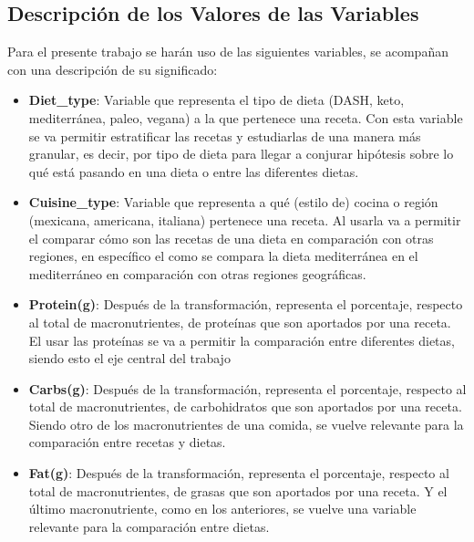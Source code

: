 \documentclass[12pt,a4paper]{article}
\begin{document}
    \subsection{Descripción de los Valores de las Variables}
    Para el presente trabajo se harán uso de las siguientes variables, se 
    acompañan con una descripción de su significado:
    \begin{itemize}[label=\textbullet]
        \item \textbf{Diet\_type}: Variable que representa el tipo de 
        dieta (DASH, keto, mediterránea, paleo, vegana) a la que 
        pertenece una receta. Con esta variable se va permitir estratificar 
        las recetas y estudiarlas de una manera más granular, es decir, 
        por tipo de dieta para llegar a conjurar hipótesis sobre lo qué 
        está pasando en una dieta o entre las diferentes dietas.
        \item \textbf{Cuisine\_type}: Variable que representa a qué (estilo 
        de) cocina o región (mexicana, americana, italiana) pertenece una 
        receta. Al usarla va a permitir el comparar cómo son las recetas 
        de una dieta en comparación con otras regiones, en específico el 
        como se compara la dieta mediterránea en el mediterráneo en comparación 
        con otras regiones geográficas.
        \item \textbf{Protein(g)}: Después de la transformación, representa el 
        porcentaje, respecto al total de macronutrientes, de proteínas que son 
        aportados por una receta. El usar las proteínas se va a permitir la 
        comparación entre diferentes dietas, siendo esto el eje central del trabajo
        \item \textbf{Carbs(g)}: Después de la transformación, representa el 
        porcentaje, respecto al total de macronutrientes, de carbohidratos que 
        son aportados por una receta. Siendo otro de los macronutrientes de una 
        comida, se vuelve relevante para la comparación entre recetas y dietas.
        \item \textbf{Fat(g)}: Después de la transformación, representa el 
        porcentaje, respecto al total de macronutrientes, de grasas que son 
        aportados por una receta. Y el último macronutriente, como en los 
        anteriores, se vuelve una variable relevante para la comparación entre dietas.
    \end{itemize}
\end{document}
